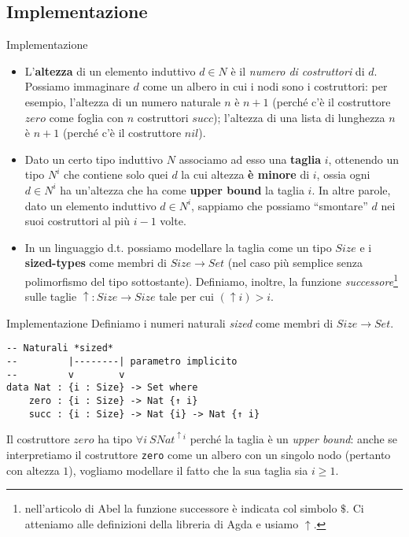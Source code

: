 \documentclass[t,aspectratio=169,10pt]{beamer}
\begin{document}
\subsection{Implementazione}
\begin{frame}{Implementazione}
	\begin{itemize}
		\item{
		L'{\bf altezza} di un elemento induttivo $d \in N$ è il
			{\it numero di costruttori} di $d$. Possiamo immaginare $d$ come
		un albero in cui i nodi sono i costruttori: per esempio,
		l'altezza di un numero naturale $n$ è $n+1$ (perché c'è il
		costruttore $zero$ come foglia con $n$ costruttori $succ$);
		l'altezza di una lista di lunghezza $n$ è $n+1$ (perché c'è
		il costruttore $nil$).
		}
		\item {
		      Dato un certo tipo induttivo $N$ associamo ad esso una {\bf
				      taglia} $i$, ottenendo un tipo $N^i$ che contiene solo quei
		      $d$ la cui altezza {\bf è minore} di $i$, ossia ogni $d \in
			      N^i$ ha un'altezza che ha come {\bf upper bound} la taglia
		      $i$. In altre parole, dato un elemento induttivo $d \in
			      N^{i}$, sappiamo che possiamo ``smontare'' $d$ nei suoi
		      costruttori al più $i-1$ volte. }
		\item  {
		      In un linguaggio d.t. possiamo modellare la taglia come un
		      tipo $Size$ e i {\bf sized-types} come membri di $Size
			      \rightarrow Set$ (nel caso più semplice senza polimorfismo
		      del tipo sottostante). Definiamo, inoltre, la funzione {\it
				      successore}\footnote{nell'articolo di Abel la funzione
			      successore è indicata col simbolo $\$$. Ci atteniamo alle
			      definizioni della libreria di Agda e usiamo $\uparrow$.} sulle
		      taglie $\uparrow : Size \rightarrow Size$ tale per cui
		      $(\uparrow i) > i$.
		      }
	\end{itemize}
\end{frame}
\begin{frame}[fragile]{Implementazione}
	Definiamo i numeri naturali {\it sized} come membri di $Size \rightarrow Set$.
	\begin{verbatim}
-- Naturali *sized*
--         |--------| parametro implicito
--         v        v
data Nat : {i : Size} -> Set where
    zero : {i : Size} -> Nat {↑ i} 
    succ : {i : Size} -> Nat {i} -> Nat {↑ i}
\end{verbatim}
	Il costruttore $zero$ ha tipo $\forall i ~ SNat^{\uparrow i}$ perché la taglia è
	un {\it upper bound}: anche se interpretiamo il costruttore \texttt{zero} come un albero
	con un singolo nodo (pertanto con altezza $1$), vogliamo modellare il fatto che
	la sua taglia sia $i \geq 1$.
\end{frame}
\end{document}
